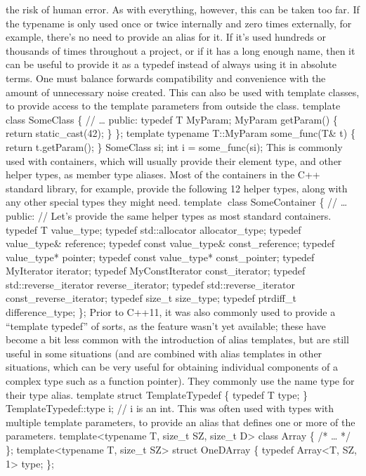 the risk of human error. As with everything, however, this can be taken
too far. If the typename is only used once or twice internally and zero
times externally, for example, there's no need to provide an alias for
it. If it's used hundreds or thousands of times throughout a project, or
if it has a long enough name, then it can be useful to provide it as a
typedef instead of always using it in absolute terms. One must balance
forwards compatibility and convenience with the amount of unnecessary
noise created. This can also be used with template classes, to provide
access to the template parameters from outside the class. template class
SomeClass \{ // \ldots{} public: typedef T MyParam; MyParam getParam()
\{ return static\_cast(42); \} \}; template typename T::MyParam
some\_func(T\& t) \{ return t.getParam(); \} SomeClass si; int i =
some\_func(si); This is commonly used with containers, which will
usually provide their element type, and other helper types, as member
type aliases. Most of the containers in the C++ standard library, for
example, provide the following 12 helper types, along with any other
special types they might need. template class SomeContainer \{ //
\ldots{} public: // Let's provide the same helper types as most standard
containers. typedef T value\_type; typedef std::allocator
allocator\_type; typedef value\_type\& reference; typedef const
value\_type\& const\_reference; typedef value\_type* pointer; typedef
const value\_type* const\_pointer; typedef MyIterator iterator; typedef
MyConstIterator const\_iterator; typedef std::reverse\_iterator
reverse\_iterator; typedef std::reverse\_iterator
const\_reverse\_iterator; typedef size\_t size\_type; typedef ptrdiff\_t
difference\_type; \}; Prior to C++11, it was also commonly used to
provide a ``template typedef'' of sorts, as the feature wasn't yet
available; these have become a bit less common with the introduction of
alias templates, but are still useful in some situations (and are
combined with alias templates in other situations, which can be very
useful for obtaining individual components of a complex type such as a
function pointer). They commonly use the name type for their type alias.
template struct TemplateTypedef \{ typedef T type; \}
TemplateTypedef::type i; // i is an int. This was often used with types
with multiple template parameters, to provide an alias that deﬁnes one
or more of the parameters. template\textless typename T, size\_t SZ,
size\_t D\textgreater{} class Array \{ /* \ldots{} */ \};
template\textless typename T, size\_t SZ\textgreater{} struct OneDArray
\{ typedef Array\textless T, SZ, 1\textgreater{} type; \};
